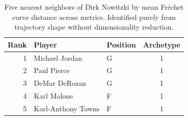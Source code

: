 \begin{table}[htbp]
  \centering\small
  \begin{tabular}{rllc}
    \toprule
    Rank & Player & Position & Archetype \\
    \midrule
    1 & Michael Jordan & G & 1 \\
    2 & Paul Pierce & G & 1 \\
    3 & DeMar DeRozan & G & 1 \\
    4 & Karl Malone & F & 1 \\
    5 & Karl-Anthony Towns & F & 1 \\
    \bottomrule
  \end{tabular}
  \caption{Five nearest neighbors of Dirk Nowitzki by mean Fr\'{e}chet curve distance across metrics. Identified purely from trajectory shape without dimensionality reduction.}
  \label{tab:Dirk_Nowitzki_frechet_curve_neighbors}
\end{table}

